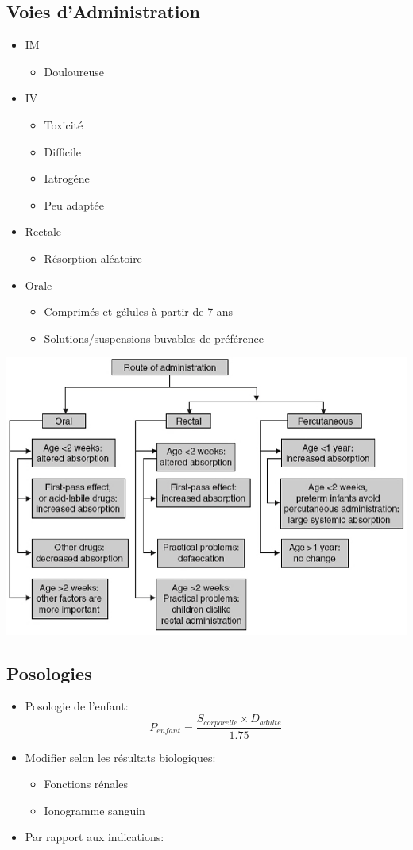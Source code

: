 \documentclass[11pt]{article}
\begin{document}
\subsection{Voies d'Administration}
\label{sec:org463d1da}
\begin{itemize}
\item IM
\begin{itemize}
\item Douloureuse
\end{itemize}
\item IV
\begin{itemize}
\item Toxicité
\item Difficile
\item Iatrogéne
\item Peu adaptée
\end{itemize}
\item Rectale
\begin{itemize}
\item Résorption aléatoire
\end{itemize}
\item Orale
\begin{itemize}
\item Comprimés et gélules à partir de 7 ans
\item Solutions/suspensions buvables de préférence
\end{itemize}
\end{itemize}
\begin{center}
\includegraphics[width=.9\linewidth]{./pediatrie_administration.png}
\end{center}
\subsection{Posologies}
\label{sec:orge98b371}
\begin{itemize}
\item Posologie de l'enfant:
\[
  P_{enfant} = \frac{ S_{corporelle} \times D_{adulte} }{1.75}
  \]
\item Modifier selon les résultats biologiques:
\begin{itemize}
\item Fonctions rénales
\item Ionogramme sanguin
\end{itemize}
\item Par rapport aux indications:
\end{itemize}
\end{document}
